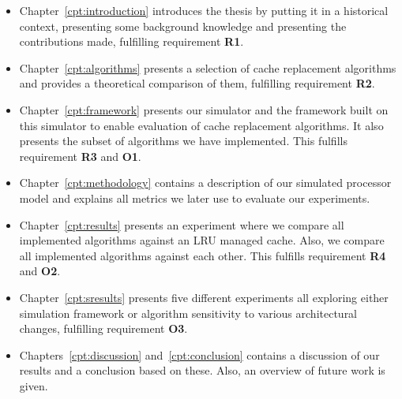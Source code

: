 \begin{itemize}
  \item Chapter~\ref{cpt:introduction} introduces the thesis by putting it in a historical context, presenting some background knowledge and presenting the contributions made, fulfilling requirement \textbf{R1}.

  \item Chapter~\ref{cpt:algorithms} presents a selection of cache replacement algorithms and provides a theoretical comparison of them, fulfilling requirement \textbf{R2}.

  \item Chapter~\ref{cpt:framework} presents our simulator and the framework built on this simulator to enable evaluation of cache replacement algorithms. It also presents the subset of algorithms we have implemented. This fulfills requirement \textbf{R3} and \textbf{O1}.

  \item Chapter~\ref{cpt:methodology} contains a description of our simulated processor model and explains all metrics we later use to evaluate our experiments.

  \item Chapter~\ref{cpt:results} presents an experiment where we compare all implemented algorithms against an LRU managed cache. Also, we compare all implemented algorithms against each other. This fulfills requirement \textbf{R4} and \textbf{O2}.

  \item Chapter~\ref{cpt:sresults} presents five different experiments all exploring either simulation framework or algorithm sensitivity to various architectural changes, fulfilling requirement \textbf{O3}.

  \item Chapters~\ref{cpt:discussion} and~\ref{cpt:conclusion} contains a discussion of our results and a conclusion based on these. Also, an overview of future work is given.

\end{itemize}